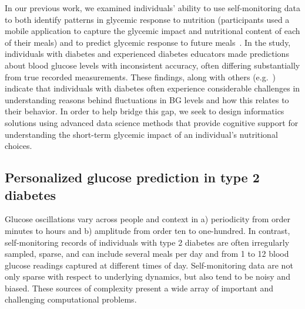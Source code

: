 \documentclass[10pt,letterpaper]{article}
\begin{document}
In our previous work, we examined individuals' ability to use self-monitoring data to both identify patterns in glycemic response to nutrition (participants used a mobile application to capture the glycemic impact and nutritional content of each of their meals) and to predict glycemic response to future meals~\cite{mamykina_data-driven_2016}. 
In the study, individuals with diabetes and experienced diabetes educators made predictions about blood glucose levels with inconsistent accuracy, often differing substantially from true recorded measurements. 
These findings, along with others (e.g.~\cite{paterson_expert_2000}) indicate that individuals with diabetes often experience considerable challenges in understanding reasons behind fluctuations in BG levels and how this relates to their behavior.
In order to help bridge this gap, we seek to design informatics solutions using advanced data science methods that provide cognitive support for understanding the short-term glycemic impact of an individual's nutritional choices.

\subsection{Personalized glucose prediction in type 2 diabetes}

Glucose oscillations vary across people and context in a) periodicity from order minutes to hours and b) amplitude from order ten to one-hundred. 
In contrast, self-monitoring records of individuals with type 2 diabetes are often irregularly sampled, sparse, and can include several meals per day and from 1 to 12 blood glucose readings captured at different times of day.
Self-monitoring data are not only sparse with respect to underlying dynamics, but also tend to be noisy and biased. These sources of complexity present a wide array of important and challenging computational problems.   
\end{document}
